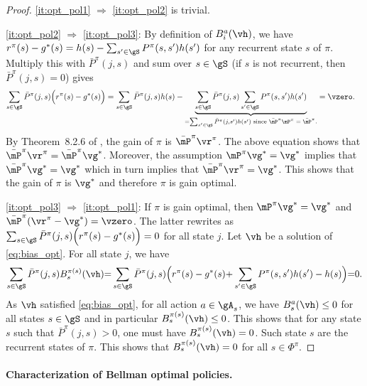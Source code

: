 \begin{proof}
    \ref{it:opt_pol1} $\Rightarrow$ \ref{it:opt_pol2} is trivial.

    \ref{it:opt_pol2} $\Rightarrow$ \ref{it:opt_pol3}: By definition of $B_i^a(\vh)$, we have $r^{\pi}(s)-g^*(s) = h(s)-\sum_{s'\in\gS} P^{\pi}(s,s')h(s')$ for any recurrent state $s$ of $\pi$.  Multiply this with $\bar{P}^\pi(j,s)$ and sum over $s\in\gS$ (if $s$ is not recurrent, then $\bar{P}^\pi(j,s)=0$) gives
    \begin{align*}
        \sum_{s\in\gS} \bar{P}^\pi(j,s)\Big(r^{\pi}(s)-g^*(s)\Big) = \sum_{s\in\gS} \bar{P}^\pi(j,s)h(s) - \underbrace{\sum_{s\in\gS} \bar{P}^\pi(j,s)\sum_{s'\in\gS} P^{\pi}(s,s')h(s')}_{=\sum_{s'\in\gS} \bar{P}^\pi(j,s')h(s') \text{ since $\bar{\mP}^\pi\mP^\pi=\bar{\mP}^\pi$.}}
        &= \vzero.
    \end{align*}
    By Theorem~8.2.6 of \cite{puterman2014markov}, the gain of $\pi$ is $\bar{\mP}^\pi \vr^\pi$. The above equation shows that $\bar{\mP}^\pi\vr^\pi = \bar{\mP}^\pi\vg^*$. Moreover, the assumption  $\mP^\pi\vg^*=\vg^*$ implies that $\bar{\mP}^\pi\vg^*=\vg^*$ which in turn implies that $\bar{\mP}^\pi\vr^\pi=\vg^*$. This shows that the gain of $\pi$ is $\vg^*$ and therefore $\pi$ is gain optimal.

    \ref{it:opt_pol3} $\Rightarrow$ \ref{it:opt_pol1}: If $\pi$ is gain optimal, then $\mP^\pi \vg^*=\vg^*$ and $\bar{\mP}^\pi(\vr^\pi-\vg^*)=\vzero$.
    The latter rewrites as $\sum_{s\in\gS}\bar{P}^\pi(j,s)\Big(r^{\pi}(s)-g^*(s)\Big) =0$ for all state $j$. Let $\vh$ be a solution of \eqref{eq:bias_opt}.
    For all state $j$, we have    
    \begin{align}
        \label{eq:apx_proof_H}
        \sum_{s\in\gS}\bar{P}^\pi(j,s)B^{\pi(s)}_s(\vh) {=} \sum_{s\in\gS}\bar{P}^\pi(j,s)\Big(r^{\pi}(s)-g^*(s) {+}\sum_{s'\in\gS}P^{\pi}(s,s')h(s') -h(s)\Big) {=}0.
    \end{align}
    As $\vh$ satisfied \eqref{eq:bias_opt}, for all action $a\in\gA_s$, we have $B^{a}_s(\vh) \le0$ for all states $s\in\gS$ and in particular $B^{\pi(s)}_s(\vh) \le0$.
    This shows that for any state $s$ such that $\bar{P}^\pi(j,s)>0$, one must have $B^{\pi(s)}_s(\vh) =0$. Such state $s$ are the recurrent states of $\pi$.
    This shows that $B^{\pi(s)}_s(\vh) =0$ for all $s\in\Phi^\pi$.
\end{proof}

\paragraph{Characterization of Bellman optimal policies.}

